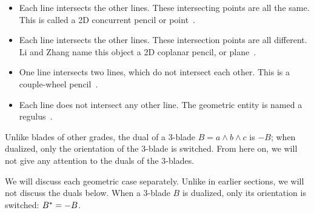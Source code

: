 \begin{itemize}
  \item Each line intersects the other lines.  These intersecting points are all the same.  This is called a 2D concurrent pencil or point~\cite{Hongbo}.
  \item Each line intersects the other lines.  These intersection points are all different.  Li and Zhang name this object a 2D coplanar pencil, or plane~\cite{Hongbo}.
  \item One line intersects two lines, which do not intersect each other.  This is a couple-wheel pencil~\cite{Hongbo}.
  \item Each line does not intersect any other line.  The geometric entity is named a regulus~\cite[Section 3.3]{Pottmann}.
\end{itemize}

Unlike blades of other grades, the dual of a 3-blade $B = a \wedge b \wedge c$ is $-B$; when dualized, only the orientation of the 3-blade is switched.  From here on, we will not give any attention to the duals of the 3-blades.

We will discuss each geometric case separately.  Unlike in earlier sections, we will not discuss the duals below.  When a 3-blade $B$ is dualized, only its orientation is switched: $B^\ast = -B$.
